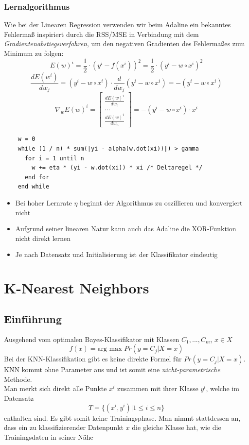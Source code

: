 \documentclass{report}
\begin{document}
  \subsection{Lernalgorithmus}
  Wie bei der Linearen Regression verwenden wir beim Adaline ein bekanntes Fehlermaß inspiriert
  durch die RSS/MSE in Verbindung mit dem \textit{Gradientenabstiegsverfahren}, um den negativen Gradienten
  des Fehlermaßes zum Minimum zu folgen:\\
  $$E(w)^i = \frac{1}{2}\cdot (y^i - f(x^i))^2 = \frac{1}{2}\cdot(y^i - w\circ x^i)^2$$
  $$\frac{dE(w^i)}{dw_j} = (y^i - w\circ x^i)\cdot \frac{d}{dw_j}(y^i - w\circ x^i) = -(y^i - w\circ x^i)$$	
  $$\nabla_wE(w)^i = \begin{bmatrix}\frac{dE(w)^i}{dw_0}\\...\\\frac{dE(w)^i}{dw_n}\end{bmatrix} = -(y^i - w\circ x^i)\cdot x^i$$
  
  \begin{lstlisting}
    w = 0	
    while (1 / n) * sum(|yi - alpha(w.dot(xi))|) > gamma
      for i = 1 until n
        w += eta * (yi - w.dot(xi)) * xi /* Deltaregel */
      end for
    end while
  \end{lstlisting}

  \begin{itemize}
    \item Bei hoher Lernrate $\eta$ beginnt der Algorithmus zu oszillieren und konvergiert nicht
    \item Aufgrund seiner linearen Natur kann auch das Adaline die XOR-Funktion nicht direkt lernen	
    \item Je nach Datensatz und Initialisierung ist der Klassifikator eindeutig	
  \end{itemize}


  \chapter{K-Nearest Neighbors}	
  \section{Einführung}	
  Ausgehend vom optimalen Bayes-Klassifikator mit Klassen $C_1, ..., C_m$, $x\in X$	
  $$f(x) = \text{arg max } Pr(y=C_j|X=x)$$	
  Bei der KNN-Klassifikation gibt es keine direkte Formel für $Pr(y = C_j|X = x)$.\\	
  KNN kommt ohne Parameter aus und ist somit eine \textit{nicht-parametrische} Methode.\\	
  Man merkt sich direkt alle Punkte $x^i$ zusammen mit ihrer Klasse $y^i$, welche im Datensatz	
  $$T = \{(x^i, y^i)|1\leq i \leq n\}$$	
  enthalten sind. Es gibt somit keine Trainingsphase. Man nimmt stattdessen an, dass ein zu klassifizierender	
  Datenpunkt $x$ die gleiche Klasse hat, wie die Trainingsdaten in seiner Nähe	
  
\end{document}

